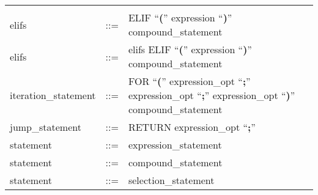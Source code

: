 \documentclass[11pt]{article}
\begin{document}
\begin{longtable}{lrl}
\begin{minipage}[t]{\rulerhs}
  \end{minipage}                                                             \\
elifs                                      & ::= &
  \begin{minipage}[t]{\rulerhs}
    \raggedright
    ELIF ``{\bf (}'' expression ``{\bf )}'' compound\_statement
  \end{minipage}                                                             \\
elifs                                      & ::= &
  \begin{minipage}[t]{\rulerhs}
    \raggedright
    elifs ELIF ``{\bf (}'' expression ``{\bf )}'' compound\_statement
  \end{minipage}                                                             \\
iteration\_statement                       & ::= &
  \begin{minipage}[t]{\rulerhs}
    \raggedright
    FOR ``{\bf (}'' expression\_opt ``{\bf ;}'' expression\_opt ``{\bf ;}'' expression\_opt ``{\bf )}'' compound\_statement
  \end{minipage}                                                             \\
jump\_statement                            & ::= &
  \begin{minipage}[t]{\rulerhs}
    \raggedright
    RETURN expression\_opt ``{\bf ;}''
  \end{minipage}                                                             \\
statement                                  & ::= &
  \begin{minipage}[t]{\rulerhs}
    \raggedright
    expression\_statement
  \end{minipage}                                                             \\
statement                                  & ::= &
  \begin{minipage}[t]{\rulerhs}
    \raggedright
    compound\_statement
  \end{minipage}                                                             \\
statement                                  & ::= &
  \begin{minipage}[t]{\rulerhs}
    \raggedright
    selection\_statement
  \end{minipage}                                                             \\

\end{longtable}
\end{document}
